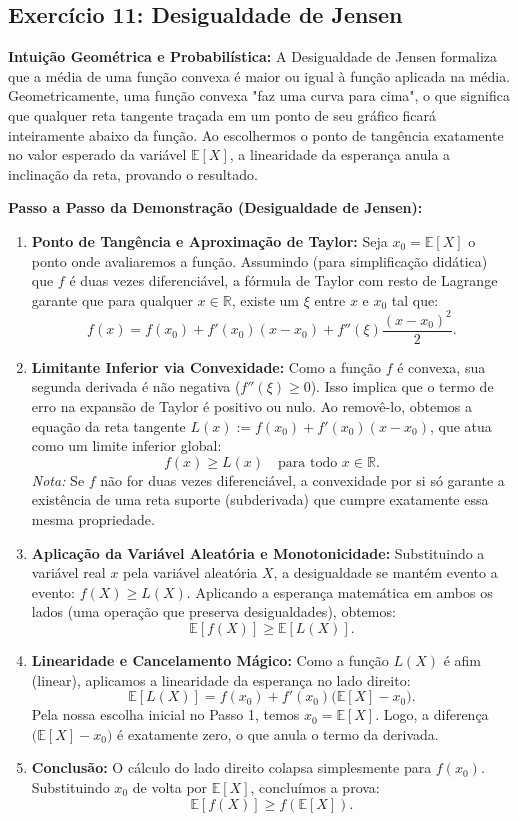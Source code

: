 \documentclass[11pt, a4paper]{article}
\begin{document}
\subsection*{Exercício 11: Desigualdade de Jensen}
\textbf{Intuição Geométrica e Probabilística:} A Desigualdade de Jensen formaliza que a média de uma função convexa é maior ou igual à função aplicada na média. Geometricamente, uma função convexa "faz uma curva para cima", o que significa que qualquer reta tangente traçada em um ponto de seu gráfico ficará inteiramente abaixo da função. Ao escolhermos o ponto de tangência exatamente no valor esperado da variável $\mathbb{E}[X]$, a linearidade da esperança anula a inclinação da reta, provando o resultado.

\textbf{Passo a Passo da Demonstração (Desigualdade de Jensen):}
\begin{enumerate}
    \item \textbf{Ponto de Tangência e Aproximação de Taylor:} Seja $x_0 = \mathbb{E}[X]$ o ponto onde avaliaremos a função. Assumindo (para simplificação didática) que $f$ é duas vezes diferenciável, a fórmula de Taylor com resto de Lagrange garante que para qualquer $x \in \mathbb{R}$, existe um $\xi$ entre $x$ e $x_0$ tal que:
    \[ f(x) = f(x_0) + f'(x_0)(x - x_0) + f''(\xi)\frac{(x-x_0)^2}{2}. \]
    \item \textbf{Limitante Inferior via Convexidade:} Como a função $f$ é convexa, sua segunda derivada é não negativa ($f''(\xi) \ge 0$). Isso implica que o termo de erro na expansão de Taylor é positivo ou nulo. Ao removê-lo, obtemos a equação da reta tangente $L(x) := f(x_0) + f'(x_0)(x - x_0)$, que atua como um limite inferior global:
    \[ f(x) \ge L(x) \quad \text{para todo } x \in \mathbb{R}. \]
    \textit{Nota:} Se $f$ não for duas vezes diferenciável, a convexidade por si só garante a existência de uma reta suporte (subderivada) que cumpre exatamente essa mesma propriedade.
    \item \textbf{Aplicação da Variável Aleatória e Monotonicidade:} Substituindo a variável real $x$ pela variável aleatória $X$, a desigualdade se mantém evento a evento: $f(X) \ge L(X)$. Aplicando a esperança matemática em ambos os lados (uma operação que preserva desigualdades), obtemos:
    \[ \mathbb{E}[f(X)] \ge \mathbb{E}[L(X)]. \]
    \item \textbf{Linearidade e Cancelamento Mágico:} Como a função $L(X)$ é afim (linear), aplicamos a linearidade da esperança no lado direito:
    \[ \mathbb{E}[L(X)] = f(x_0) + f'(x_0)\big(\mathbb{E}[X] - x_0\big). \]
    Pela nossa escolha inicial no Passo 1, temos $x_0 = \mathbb{E}[X]$. Logo, a diferença $\big(\mathbb{E}[X] - x_0\big)$ é exatamente zero, o que anula o termo da derivada.
    \item \textbf{Conclusão:} O cálculo do lado direito colapsa simplesmente para $f(x_0)$. Substituindo $x_0$ de volta por $\mathbb{E}[X]$, concluímos a prova:
    \[ \mathbb{E}[f(X)] \ge f(\mathbb{E}[X]). \]
\end{enumerate}
\end{document}
